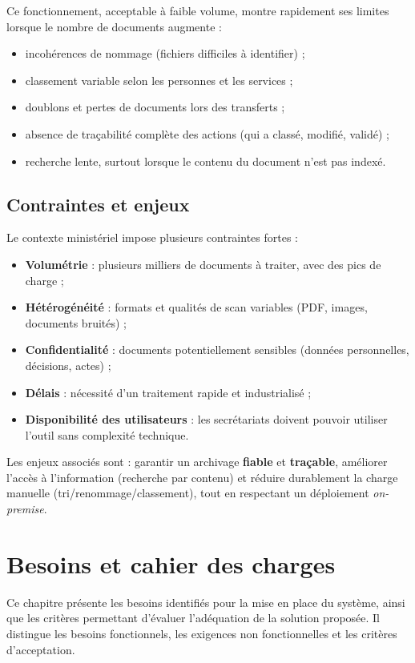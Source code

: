\documentclass[12pt,a4paper]{report}
\begin{document}
Ce fonctionnement, acceptable à faible volume, montre rapidement ses limites lorsque le nombre de documents augmente :
\begin{itemize}
  \item incohérences de nommage (fichiers difficiles à identifier) ;
  \item classement variable selon les personnes et les services ;
  \item doublons et pertes de documents lors des transferts ;
  \item absence de traçabilité complète des actions (qui a classé, modifié, validé) ;
  \item recherche lente, surtout lorsque le contenu du document n’est pas indexé.
\end{itemize}

\section{Contraintes et enjeux}
Le contexte ministériel impose plusieurs contraintes fortes :
\begin{itemize}
  \item \textbf{Volumétrie} : plusieurs milliers de documents à traiter, avec des pics de charge ;
  \item \textbf{Hétérogénéité} : formats et qualités de scan variables (PDF, images, documents bruités) ;
  \item \textbf{Confidentialité} : documents potentiellement sensibles (données personnelles, décisions, actes) ;
  \item \textbf{Délais} : nécessité d’un traitement rapide et industrialisé ;
  \item \textbf{Disponibilité des utilisateurs} : les secrétariats doivent pouvoir utiliser l’outil sans complexité technique.
\end{itemize}

Les enjeux associés sont : garantir un archivage \textbf{fiable} et \textbf{traçable}, améliorer l’accès à l’information (recherche par contenu) et réduire durablement la charge manuelle (tri/renommage/classement), tout en respectant un déploiement \textit{on-premise}.

\chapter{Besoins et cahier des charges}
Ce chapitre présente les besoins identifiés pour la mise en place du système, ainsi que les critères permettant d’évaluer l’adéquation de la solution proposée. Il distingue les besoins fonctionnels, les exigences non fonctionnelles et les critères d’acceptation.
\end{document}
